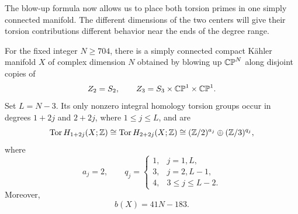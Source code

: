 The blow-up formula now allows us to place both torsion primes in one
simply connected manifold. The different dimensions of the two centers
will give their torsion contributions different behavior near the ends
of the degree range.

\begin{proposition}
\label{prop:torsion-space}
For the fixed integer $N\geq704$, there is a simply connected compact
K\"ahler manifold $X$ of complex dimension $N$ obtained by blowing up
$\mathbb{CP}^N$ along disjoint copies of
\[
 Z_2=S_2,\qquad Z_3=S_3\times\mathbb{CP}^1\times\mathbb{CP}^1.
\]
Set $L=N-3$. Its only nonzero integral homology torsion groups occur
in degrees $1+2j$ and $2+2j$, where $1\leq j\leq L$, and are
\begin{equation}
\label{eq:X-torsion}
 \operatorname{Tor} H_{1+2j}(X;\mathbb Z)\cong\operatorname{Tor} H_{2+2j}(X;\mathbb Z)
 \cong(\mathbb Z/2)^{a_j}\oplus(\mathbb Z/3)^{q_j},
\end{equation}
where
\begin{equation}
\label{eq:torsion-profiles}
 a_j=2,\qquad
 q_j=
 \begin{cases}
  1,&j=1,L,\\
  3,&j=2,L-1,\\
  4,&3\leq j\leq L-2.
 \end{cases}
\end{equation}
Moreover,
\begin{equation}
\label{eq:rank-X}
 b(X)=41N-183.
\end{equation}
\end{proposition}

